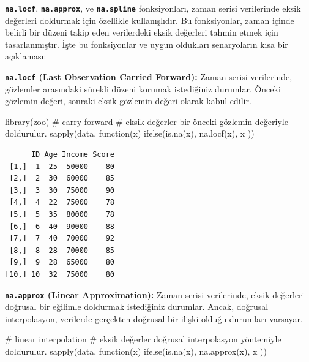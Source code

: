 \documentclass[
  letterpaper,
  DIV=11,
  numbers=noendperiod]{scrreprt}
\newenvironment{Shaded}{\begin{snugshade}}{\end{snugshade}}
\newcommand{\CommentTok}[1]{\textcolor[rgb]{0.37,0.37,0.37}{#1}}
\newcommand{\ControlFlowTok}[1]{\textcolor[rgb]{0.00,0.23,0.31}{#1}}
\newcommand{\FunctionTok}[1]{\textcolor[rgb]{0.28,0.35,0.67}{#1}}
\newcommand{\NormalTok}[1]{\textcolor[rgb]{0.00,0.23,0.31}{#1}}
\begin{document}
\textbf{\texttt{na.locf}}, \textbf{\texttt{na.approx}}, ve
\textbf{\texttt{na.spline}} fonksiyonları, zaman serisi verilerinde
eksik değerleri doldurmak için özellikle kullanışlıdır. Bu fonksiyonlar,
zaman içinde belirli bir düzeni takip eden verilerdeki eksik değerleri
tahmin etmek için tasarlanmıştır. İşte bu fonksiyonlar ve uygun
oldukları senaryoların kısa bir açıklaması:

\textbf{\texttt{na.locf} (Last Observation Carried Forward):} Zaman
serisi verilerinde, gözlemler arasındaki sürekli düzeni korumak
istediğiniz durumlar. Önceki gözlemin değeri, sonraki eksik gözlemin
değeri olarak kabul edilir.

\begin{Shaded}
\begin{Highlighting}[]
\FunctionTok{library}\NormalTok{(zoo)}
\CommentTok{\# carry forward}
\CommentTok{\# eksik değerler bir önceki gözlemin değeriyle doldurulur.}
\FunctionTok{sapply}\NormalTok{(data, }\ControlFlowTok{function}\NormalTok{(x) }\FunctionTok{ifelse}\NormalTok{(}\FunctionTok{is.na}\NormalTok{(x), }\FunctionTok{na.locf}\NormalTok{(x), x ))}
\end{Highlighting}
\end{Shaded}

\begin{verbatim}
      ID Age Income Score
 [1,]  1  25  50000    80
 [2,]  2  30  60000    85
 [3,]  3  30  75000    90
 [4,]  4  22  75000    78
 [5,]  5  35  80000    78
 [6,]  6  40  90000    88
 [7,]  7  40  70000    92
 [8,]  8  28  70000    85
 [9,]  9  28  65000    80
[10,] 10  32  75000    80
\end{verbatim}

\textbf{\texttt{na.approx} (Linear Approximation):} Zaman serisi
verilerinde, eksik değerleri doğrusal bir eğilimle doldurmak istediğiniz
durumlar. Ancak, doğrusal interpolasyon, verilerde gerçekten doğrusal
bir ilişki olduğu durumları varsayar.

\begin{Shaded}
\begin{Highlighting}[]
\CommentTok{\# linear interpolation}
\CommentTok{\# eksik değerler doğrusal interpolasyon yöntemiyle doldurulur.}
\FunctionTok{sapply}\NormalTok{(data, }\ControlFlowTok{function}\NormalTok{(x) }\FunctionTok{ifelse}\NormalTok{(}\FunctionTok{is.na}\NormalTok{(x), }\FunctionTok{na.approx}\NormalTok{(x), x ))}
\end{Highlighting}
\end{Shaded}
\end{document}
